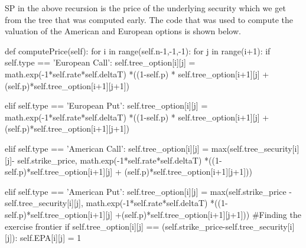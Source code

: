 \documentclass[12pt]{report}
\begin{document}
SP in the above recursion is the price of the underlying security which we get from the tree that was computed early. The code that was used to compute the valuation of the American and European options is shown below.
\begin{tiny}
	\begin{python}

	def computePrice(self):
	 for i in range(self.n-1,-1,-1):
	  for j in range(i+1):
		if self.type == 'European Call':
		 self.tree_option[i][j] = math.exp(-1*self.rate*self.deltaT)
								          *((1-self.p) * self.tree_option[i+1][j] 
								          + (self.p)*self.tree_option[i+1][j+1])
		
		elif self.type == 'European Put':
		 self.tree_option[i][j] = math.exp(-1*self.rate*self.deltaT)
		                      *((1-self.p) * self.tree_option[i+1][j] 
		                       + (self.p)*self.tree_option[i+1][j+1])
		
		elif self.type == 'American Call':
		 self.tree_option[i][j] = max(self.tree_security[i][j]-
		                          self.strike_price,
		                         math.exp(-1*self.rate*self.deltaT)
		                        *((1-self.p)*self.tree_option[i+1][j] 
		                     + (self.p)*self.tree_option[i+1][j+1]))
		
		elif self.type == 'American Put':
		 self.tree_option[i][j] = max(self.strike_price
		                       -self.tree_security[i][j],
		                       math.exp(-1*self.rate*self.deltaT)
		                       *((1-self.p)*self.tree_option[i+1][j]
		                       +(self.p)*self.tree_option[i+1][j+1]))
		 #Finding the exercise frontier
		 if self.tree_option[i][j] == (self.strike_price-self.tree_security[i][j]):
          self.EPA[i][j] = 1
\end{python}
\end{tiny}
\end{document}
